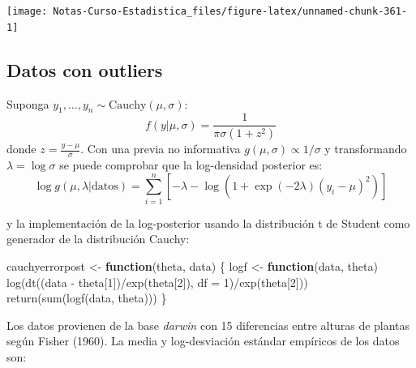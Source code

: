 \documentclass[
  12pt,
]{book}
\newenvironment{Shaded}{\begin{snugshade}}{\end{snugshade}}
\newcommand{\AttributeTok}[1]{\textcolor[rgb]{0.77,0.63,0.00}{#1}}
\newcommand{\ControlFlowTok}[1]{\textcolor[rgb]{0.13,0.29,0.53}{\textbf{#1}}}
\newcommand{\DecValTok}[1]{\textcolor[rgb]{0.00,0.00,0.81}{#1}}
\newcommand{\FunctionTok}[1]{\textcolor[rgb]{0.00,0.00,0.00}{#1}}
\newcommand{\NormalTok}[1]{#1}
\newcommand{\OtherTok}[1]{\textcolor[rgb]{0.56,0.35,0.01}{#1}}
\newcommand{\SpecialCharTok}[1]{\textcolor[rgb]{0.00,0.00,0.00}{#1}}
\theoremstyle{definition}
\theoremstyle{definition}
\theoremstyle{definition}
\theoremstyle{definition}
\theoremstyle{remark}
\begin{document}
\begin{center}\texttt{[image: Notas-Curso-Estadistica\_files/figure-latex/unnamed-chunk-361-1]} \end{center}

\hypertarget{datos-con-outliers}{%
\subsection{Datos con outliers}\label{datos-con-outliers}}

Suponga \(y_1,\ldots,y_n\sim \text{Cauchy}(\mu,\sigma)\):
\[f(y|\mu,\sigma)=\frac{1}{\pi\sigma(1+z^2)}\]
donde \(z=\frac{y-\mu}{\sigma}\). Con una previa no informativa \(g(\mu,\sigma)\propto 1/\sigma\) y transformando \(\lambda = \log \sigma\) se puede comprobar que la log-densidad posterior es:
\[\log g(\mu,\lambda|\text{datos}) = \sum_{i=1}^n\left[-\lambda-\log\left(1+\exp(-2\lambda)(y_i-\mu)^2\right)\right]\]

y la implementación de la log-posterior usando la distribución t de Student como generador de la distribución Cauchy:

\begin{Shaded}
\begin{Highlighting}[]
\NormalTok{cauchyerrorpost }\OtherTok{\textless{}{-}} \ControlFlowTok{function}\NormalTok{(theta, data) \{}
\NormalTok{    logf }\OtherTok{\textless{}{-}} \ControlFlowTok{function}\NormalTok{(data, theta) }\FunctionTok{log}\NormalTok{(}\FunctionTok{dt}\NormalTok{((data }\SpecialCharTok{{-}}\NormalTok{ theta[}\DecValTok{1}\NormalTok{])}\SpecialCharTok{/}\FunctionTok{exp}\NormalTok{(theta[}\DecValTok{2}\NormalTok{]),}
        \AttributeTok{df =} \DecValTok{1}\NormalTok{)}\SpecialCharTok{/}\FunctionTok{exp}\NormalTok{(theta[}\DecValTok{2}\NormalTok{]))}
    \FunctionTok{return}\NormalTok{(}\FunctionTok{sum}\NormalTok{(}\FunctionTok{logf}\NormalTok{(data, theta)))}
\NormalTok{\}}
\end{Highlighting}
\end{Shaded}

Los datos provienen de la base \emph{darwin} con 15 diferencias entre alturas de plantas según Fisher (1960). La media y log-desviación estándar empíricos de los datos son:

\begin{Shaded}
\end{Shaded}
\end{document}

